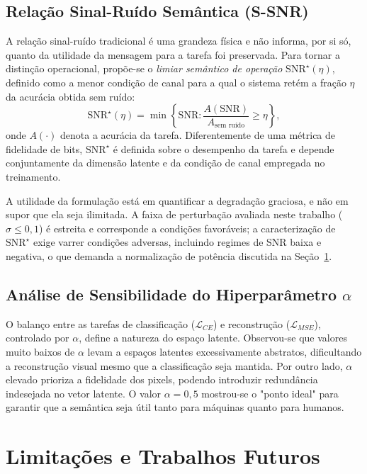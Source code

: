 \documentclass[conference,twocolumn]{IEEEtran}
\begin{document}
\subsection{Relação Sinal-Ruído Semântica (S-SNR)}
A relação sinal-ruído tradicional é uma grandeza física e não informa, por si só, quanto da utilidade da mensagem para a tarefa foi preservada. Para tornar a distinção operacional, propõe-se o \emph{limiar semântico de operação} $\mathrm{SNR}^\star(\eta)$, definido como a menor condição de canal para a qual o sistema retém a fração $\eta$ da acurácia obtida sem ruído:
\begin{equation}
    \mathrm{SNR}^\star(\eta) = \min \left\{ \mathrm{SNR} : \frac{A(\mathrm{SNR})}{A_{\text{sem ruído}}} \geq \eta \right\},
\end{equation}
onde $A(\cdot)$ denota a acurácia da tarefa. Diferentemente de uma métrica de fidelidade de bits, $\mathrm{SNR}^\star$ é definida sobre o desempenho da tarefa e depende conjuntamente da dimensão latente e da condição de canal empregada no treinamento.

A utilidade da formulação está em quantificar a degradação graciosa, e não em supor que ela seja ilimitada. A faixa de perturbação avaliada neste trabalho ($\sigma \leq 0,1$) é estreita e corresponde a condições favoráveis; a caracterização de $\mathrm{SNR}^\star$ exige varrer condições adversas, incluindo regimes de SNR baixa e negativa, o que demanda a normalização de potência discutida na Seção~\ref{sec:limitacoes}.

\subsection{Análise de Sensibilidade do Hiperparâmetro $\alpha$}
O balanço entre as tarefas de classificação ($\mathcal{L}_{CE}$) e reconstrução ($\mathcal{L}_{MSE}$), controlado por $\alpha$, define a natureza do espaço latente. Observou-se que valores muito baixos de $\alpha$ levam a espaços latentes excessivamente abstratos, dificultando a reconstrução visual mesmo que a classificação seja mantida. Por outro lado, $\alpha$ elevado prioriza a fidelidade dos pixels, podendo introduzir redundância indesejada no vetor latente. O valor $\alpha=0,5$ mostrou-se o "ponto ideal" para garantir que a semântica seja útil tanto para máquinas quanto para humanos.

\section{Limitações e Trabalhos Futuros}
\label{sec:limitacoes}
\end{document}
